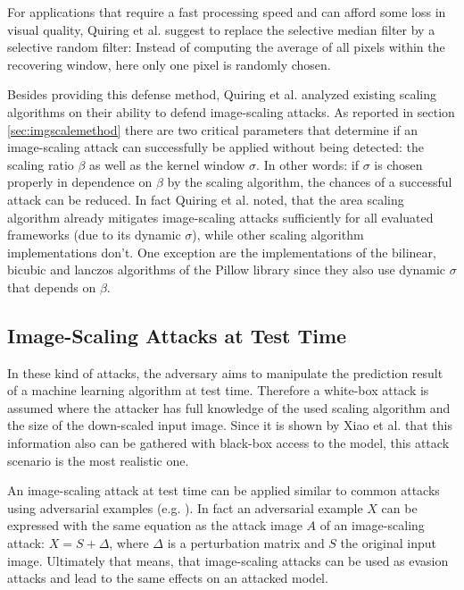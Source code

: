\documentclass[sigconf]{acmart}
\begin{document}
For applications that require a fast processing speed and can afford some loss in visual quality, Quiring et al. suggest to replace the selective median filter by a selective random filter: 
Instead of computing the average of all pixels within the recovering window, here only one pixel is randomly chosen.

Besides providing this defense method, Quiring et al. analyzed existing scaling algorithms on their ability to defend image-scaling attacks.
As reported in section \ref{sec:imgscalemethod} there are two critical parameters that determine if an image-scaling attack can successfully be applied without being detected: the scaling ratio $\beta$ as well as the kernel window $\sigma$.
In other words: if $\sigma$ is chosen properly in dependence on $\beta$ by the scaling algorithm, the chances of a successful attack can be reduced.
In fact Quiring et al. noted, that the area scaling algorithm already mitigates image-scaling attacks sufficiently for all evaluated frameworks (due to its dynamic $\sigma$), while other scaling algorithm implementations don't.
One exception are the implementations of the bilinear, bicubic and lanczos algorithms of the Pillow library since they also use dynamic $\sigma$ that depends on $\beta$. 

\subsection{Image-Scaling Attacks at Test Time}
\label{sec:testtimeatt}

In these kind of attacks, the adversary aims to manipulate the prediction result of a machine learning algorithm at test time.
Therefore a white-box attack is assumed where the attacker has full knowledge of the used scaling algorithm and the size of the down-scaled input image.
Since it is shown by Xiao et al.\cite{camouflage} that this information also can be gathered with black-box access to the model, this attack scenario is the most realistic one.

An image-scaling attack at test time can be applied similar to common attacks using adversarial examples (e.g. \cite{advexinphys, Papernot2017PracticalBA, brown2018adversarial}).
In fact an adversarial example $X$ can be expressed with the same equation as the attack image $A$ of an image-scaling attack: $X = S + \Delta$, where $\Delta$ is a perturbation matrix and $S$ the original input image.
Ultimately that means, that image-scaling attacks can be used as evasion attacks and lead to the same effects on an attacked model.
\end{document}

